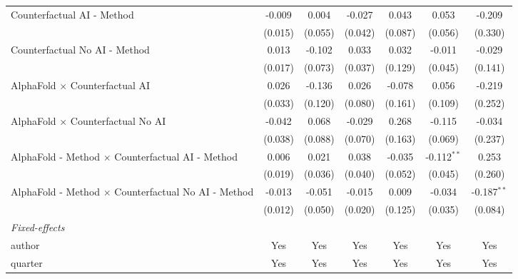 \begin{tabular}{lcccccc}
   Counterfactual AI - Method                                 & -0.009       & 0.004   & -0.027       & 0.043   & 0.053         & -0.209\\   
                                                              & (0.015)      & (0.055) & (0.042)      & (0.087) & (0.056)       & (0.330)\\   
   Counterfactual No AI - Method                              & 0.013        & -0.102  & 0.033        & 0.032   & -0.011        & -0.029\\   
                                                              & (0.017)      & (0.073) & (0.037)      & (0.129) & (0.045)       & (0.141)\\   
   AlphaFold $\times$ Counterfactual AI                       & 0.026        & -0.136  & 0.026        & -0.078  & 0.056         & -0.219\\   
                                                              & (0.033)      & (0.120) & (0.080)      & (0.161) & (0.109)       & (0.252)\\   
   AlphaFold $\times$ Counterfactual No AI                    & -0.042       & 0.068   & -0.029       & 0.268   & -0.115        & -0.034\\   
                                                              & (0.038)      & (0.088) & (0.070)      & (0.163) & (0.069)       & (0.237)\\   
   AlphaFold - Method $\times$ Counterfactual AI - Method     & 0.006        & 0.021   & 0.038        & -0.035  & -0.112$^{**}$ & 0.253\\   
                                                              & (0.019)      & (0.036) & (0.040)      & (0.052) & (0.045)       & (0.260)\\   
   AlphaFold - Method $\times$ Counterfactual No AI - Method  & -0.013       & -0.051  & -0.015       & 0.009   & -0.034        & -0.187$^{**}$\\   
                                                              & (0.012)      & (0.050) & (0.020)      & (0.125) & (0.035)       & (0.084)\\   
   \midrule
   \emph{Fixed-effects}\\
   author                                                     & Yes          & Yes     & Yes          & Yes     & Yes           & Yes\\  
   quarter                                                    & Yes          & Yes     & Yes          & Yes     & Yes           & Yes\\  

\end{tabular}
